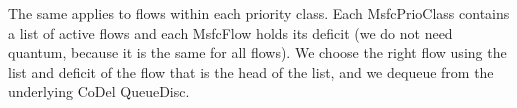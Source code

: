 The same applies to flows within each priority class. Each MsfcPrioClass contains a list of active flows and each MsfcFlow holds its deficit (we do not need quantum, because it is the same for all flows). We choose the right flow using the list and deficit of the flow that is the head of the list, and we dequeue from the underlying CoDel QueueDisc.   












